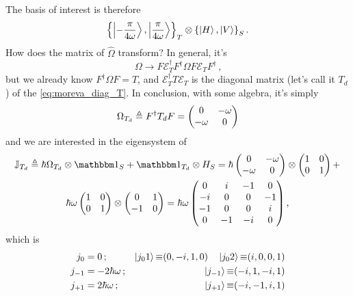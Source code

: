 The basis of interest is therefore
\begin{equation}
  \qty{\ket{-\frac{\pi}{4\omega}}, \ket{\frac{\pi}{4\omega}}}_T \otimes \qty{\ket{H}, \ket{V}}_S
  \, \text{.}
\end{equation}
How does the matrix of $\hat{\Omega}$ transform? In general, it's
\begin{equation}
  \Omega \rightarrow F \mathcal{E}_T^{\dagger} F^{\dagger} \Omega F \mathcal{E}_T F^{\dagger}
  \, \text{,}
\end{equation}
but we already know $F^{\dagger} \Omega F = T$,
and $\mathcal{E}_T^{\dagger} T \mathcal{E}_T$ is the diagonal matrix
(let's call it $T_d$) of the \eqref{eq:moreva_diag_T}.
In conclusion, with some algebra, it's simply
\begin{equation}
  \Omega_{T_d} \triangleq F^{\dagger} T_d F = \left(\begin{matrix}0 & - \omega\\- \omega & 0\end{matrix}\right)
\end{equation}
and we are interested in the eigensystem of
\begin{multline}
  \mathbb{J}_{T_d} \eqbydef \hbar \Omega_{T_d} \ox \idop_{S} + \idop_{T_d} \ox H_S =
    \hbar
    \begin{pmatrix}0 & - \omega\\- \omega & 0\end{pmatrix}
    \ox
    \begin{pmatrix} 1 & 0 \\  0 & 1 \end{pmatrix}
    + \\
    \hbar\omega
    \begin{pmatrix} 1 & 0 \\  0 & 1 \end{pmatrix}
    \ox
    \begin{pmatrix} 0 & 1 \\ -1 & 0 \end{pmatrix}
    =
    \hbar\omega
    \begin{pmatrix}
      0   &i  &-1 &0  \\
      -i  &0  &0  &-1 \\
      -1  &0  &0  &i  \\
      0   &-1 &-i &0  
    \end{pmatrix}
  \text{,}
\end{multline}
which is
\begin{align}
  j_0     &= 0\,\text{;}              &\ket{j_{0}1}   \operatorname*{\equiv} (0, -i, 1, 0) \quad \ket{j_0 2} \operatorname*{\equiv} (i, 0, 0 ,1)
    \label{eq:moreva:eigenJ0} \\
  j_{-1}  &= -2\hbar\omega\,\text{;}  &\ket{j_{-1}}   \operatorname*{\equiv} (-i, 1, -i, 1) \\
  j_{+1}   &= 2\hbar\omega\,\text{;}  &\ket{j_{+1}}   \operatorname*{\equiv} (-i, -1, i, 1)
\end{align}

